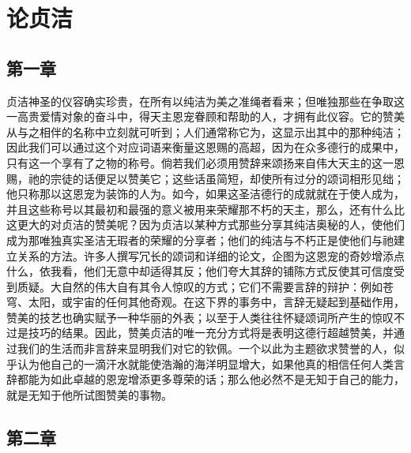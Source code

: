 
\chapter{论贞洁}



\section{第一章}

贞洁神圣的仪容确实珍贵，在所有以纯洁为美之准绳者看来；但唯独那些在争取这一高贵爱情对象的奋斗中，得天主恩宠眷顾和帮助的人，才拥有此仪容。它的赞美从与之相伴的名称中立刻就可听到；人们通常称它为，这显示出其中的那种纯洁；因此我们可以通过这个对应词语来衡量这恩赐的高超，因为在众多德行的成果中，只有这一个享有了之物的称号。倘若我们必须用赞辞来颂扬来自伟大天主的这一恩赐，祂的宗徒的话便足以赞美它；这些话虽简短，却使所有过分的颂词相形见绌；他只称那以这恩宠为装饰的人为。如今，如果这圣洁德行的成就就在于使人成为，并且这些称号以其最初和最强的意义被用来荣耀那不朽的天主，那么，还有什么比这更大的对贞洁的赞美呢？因为贞洁以某种方式那些分享其纯洁奥秘的人，使他们成为那唯独真实圣洁无瑕者的荣耀的分享者；他们的纯洁与不朽正是使他们与祂建立关系的方法。许多人撰写冗长的颂词和详细的论文，企图为这恩宠的奇妙增添点什么，依我看，他们无意中却适得其反；他们夸大其辞的铺陈方式反使其可信度受到质疑。大自然的伟大自有其令人惊叹的方式；它们不需要言辞的辩护：例如苍穹、太阳，或宇宙的任何其他奇观。在这下界的事务中，言辞无疑起到基础作用，赞美的技艺也确实赋予一种华丽的外表；以至于人类往往怀疑颂词所产生的惊叹不过是技巧的结果。因此，赞美贞洁的唯一充分方式将是表明这德行超越赞美，并通过我们的生活而非言辞来显明我们对它的钦佩。一个以此为主题欲求赞誉的人，似乎认为他自己的一滴汗水就能使浩瀚的海洋明显增大，如果他真的相信任何人类言辞都能为如此卓越的恩宠增添更多尊荣的话；那么他必然不是无知于自己的能力，就是无知于他所试图赞美的事物。\par


\section{第二章}

